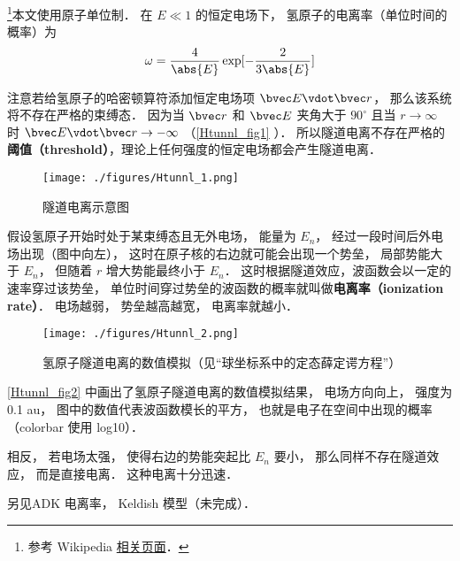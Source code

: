 

\footnote{参考 Wikipedia \href{https://en.wikipedia.org/wiki/Tunnel_ionization}{相关页面}．}本文使用原子单位制． 在 $E \ll 1$ 的恒定电场下， 氢原子的电离率（单位时间的概率）为
\begin{equation}
\omega = \frac{4}{\abs{E}} \exp[-\frac{2}{3\abs{E}}]
\end{equation}

注意若给氢原子的哈密顿算符添加恒定电场项 $\bvec E \vdot \bvec r$， 那么该系统将不存在严格的束缚态． 因为当 $\bvec r$ 和 $\bvec E$ 夹角大于 $90^\circ$ 且当 $r\to\infty$ 时 $\bvec E \vdot \bvec r \to -\infty$ （\autoref{Htunnl_fig1} ）． 所以隧道电离不存在严格的\textbf{阈值（threshold）}，理论上任何强度的恒定电场都会产生隧道电离．

\begin{figure}[ht]
\centering
\texttt{[image: ./figures/Htunnl\_1.png]}
\caption{隧道电离示意图} \label{Htunnl_fig1}
\end{figure}

假设氢原子开始时处于某束缚态且无外电场， 能量为 $E_n$， 经过一段时间后外电场出现（图中向左）， 这时在原子核的右边就可能会出现一个势垒， 局部势能大于 $E_n$， 但随着 $r$ 增大势能最终小于 $E_n$． 这时根据隧道效应，波函数会以一定的速率穿过该势垒， 单位时间穿过势垒的波函数的概率就叫做\textbf{电离率（ionization rate）}． 电场越弱， 势垒越高越宽， 电离率就越小．

\begin{figure}[ht]
\centering
\texttt{[image: ./figures/Htunnl\_2.png]}
\caption{氢原子隧道电离的数值模拟（见“球坐标系中的定态薛定谔方程”）} \label{Htunnl_fig2}
\end{figure}
\autoref{Htunnl_fig2} 中画出了氢原子隧道电离的数值模拟结果， 电场方向向上， 强度为 0.1 au， 图中的数值代表波函数模长的平方， 也就是电子在空间中出现的概率（colorbar 使用 log10）．

相反， 若电场太强， 使得右边的势能突起比 $E_n$ 要小， 那么同样不存在隧道效应， 而是直接电离． 这种电离十分迅速．

另见ADK 电离率， Keldish 模型（未完成）．
